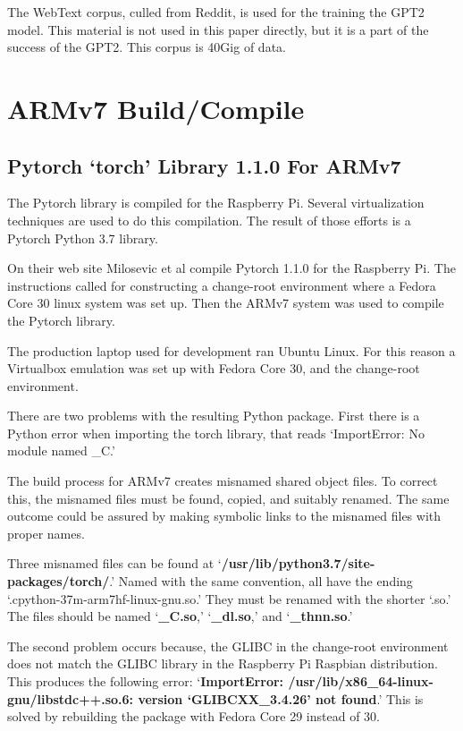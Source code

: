 The WebText corpus, culled from Reddit, is used for the training the GPT2 model. This material is not used in this paper directly, but it is a part of the success of the GPT2. This corpus is 40Gig of data.


\section{ARMv7 Build/Compile}

\subsection{Pytorch `torch' Library 1.1.0 For ARMv7}
The Pytorch library is compiled for the Raspberry Pi. Several virtualization techniques are used to do this compilation. The result of those efforts is a Pytorch Python 3.7 library. %

On their web site Milosevic et al \cite{2018Milosevic} compile Pytorch 1.1.0 for the Raspberry Pi. The instructions called for constructing a change-root environment where a Fedora Core 30 linux system was set up. Then the ARMv7 system was used to compile the Pytorch library. %

The production laptop used for development ran Ubuntu Linux. For this reason a Virtualbox emulation was set up with Fedora Core 30, and the change-root environment.%

There are two problems with the resulting Python package. First there is a Python error when importing the torch library, that reads `ImportError: No module named \_C.' 

The build process for ARMv7 creates misnamed shared object files. To correct this, the misnamed files must be found, copied, and suitably renamed. The same outcome could be assured by making symbolic links to the misnamed files with proper names.

Three misnamed files can be found at `\textbf{/usr/lib/python3.7/site-packages/torch/}.' Named with the same convention, all have the ending `.cpython-37m-arm7hf-linux-gnu.so.' They must be renamed with the shorter `.so.' The files should be named `\textbf{\_C.so},' `\textbf{\_dl.so},' and `\textbf{\_thnn.so}.'

The second problem occurs because, the GLIBC in the change-root environment does not match the GLIBC library in the Raspberry Pi Raspbian distribution. This produces the following error: `\textbf{ImportError: /usr/lib/x86\_64-linux-gnu/libstdc++.so.6: version `GLIBCXX\_3.4.26' not found}.' This is solved by rebuilding the package with Fedora Core 29 instead of 30. 
 
